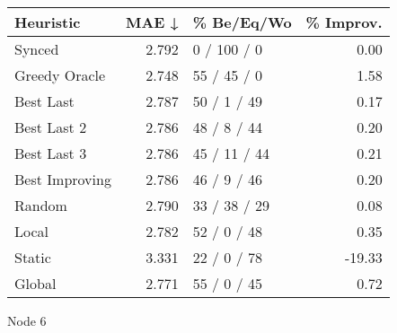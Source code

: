 \begin{tabular}{lrlr}
\toprule
\textbf{Heuristic} & \textbf{MAE ↓} & \textbf{\% Be/Eq/Wo} & \textbf{\% Improv.} \\
\midrule
            Synced &          2.792 &          0 / 100 / 0 &                0.00 \\
     Greedy Oracle &          2.748 &          55 / 45 / 0 &                1.58 \\
         Best Last &          2.787 &          50 / 1 / 49 &                0.17 \\
       Best Last 2 &          2.786 &          48 / 8 / 44 &                0.20 \\
       Best Last 3 &          2.786 &         45 / 11 / 44 &                0.21 \\
    Best Improving &          2.786 &          46 / 9 / 46 &                0.20 \\
            Random &          2.790 &         33 / 38 / 29 &                0.08 \\
             Local &          2.782 &          52 / 0 / 48 &                0.35 \\
            Static &          3.331 &          22 / 0 / 78 &              -19.33 \\
            Global &          2.771 &          55 / 0 / 45 &                0.72 \\
\bottomrule
\end{tabular}
\caption{Node 6}
\label{tab:hr_iid_lr01_le1_bs2_6}
